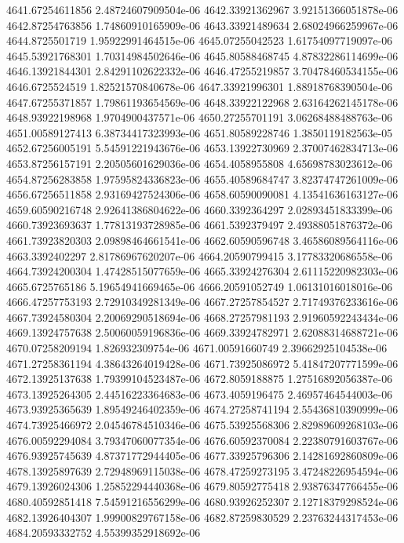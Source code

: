 {4641.67254611856 2.48724607909504e-06
4642.33921362967 3.92151366051878e-06
4642.87254763856 1.74860910165909e-06
4643.33921489634 2.68024966259967e-06
4644.8725501719 1.95922991464515e-06
4645.07255042523 1.61754097719097e-06
4645.53921768301 1.70314984502646e-06
4645.80588468745 4.87832286114699e-06
4646.13921844301 2.84291102622332e-06
4646.47255219857 3.70478460534155e-06
4646.6725524519 1.82521570840678e-06
4647.33921996301 1.88918768390504e-06
4647.67255371857 1.79861193654569e-06
4648.33922122968 2.63164262145178e-06
4648.93922198968 1.9704900437571e-06
4650.27255701191 3.06268488488763e-06
4651.00589127413 6.38734417323993e-06
4651.80589228746 1.3850119182563e-05
4652.67256005191 5.54591221943676e-06
4653.13922730969 2.37007462834713e-06
4653.87256157191 2.20505601629036e-06
4654.4058955808 4.65698783023612e-06
4654.87256283858 1.97595824336823e-06
4655.40589684747 3.82374747261009e-06
4656.67256511858 2.93169427524306e-06
4658.60590090081 4.13541636163127e-06
4659.60590216748 2.92641386804622e-06
4660.3392364297 2.02893451833399e-06
4660.73923693637 1.77813193728985e-06
4661.5392379497 2.49388051876372e-06
4661.73923820303 2.09898464661541e-06
4662.60590596748 3.46586089564116e-06
4663.3392402297 2.81786967620207e-06
4664.20590799415 3.17783320686558e-06
4664.73924200304 1.47428515077659e-06
4665.33924276304 2.61115220982303e-06
4665.6725765186 5.19654941669465e-06
4666.20591052749 1.06131016018016e-06
4666.47257753193 2.72910349281349e-06
4667.27257854527 2.71749376233616e-06
4667.73924580304 2.20069290518694e-06
4668.27257981193 2.91960592243434e-06
4669.13924757638 2.50060059196836e-06
4669.33924782971 2.62088314688721e-06
4670.07258209194 1.826932309754e-06
4671.00591660749 2.39662925104538e-06
4671.27258361194 4.38643264019428e-06
4671.73925086972 5.41847207771599e-06
4672.13925137638 1.79399104523487e-06
4672.8059188875 1.27516892056387e-06
4673.13925264305 2.44516223364683e-06
4673.4059196475 2.46957464544003e-06
4673.93925365639 1.89549246402359e-06
4674.27258741194 2.55436810390999e-06
4674.73925466972 2.04546784510346e-06
4675.53925568306 2.82989609268103e-06
4676.00592294084 3.79347060077354e-06
4676.60592370084 2.22380791603767e-06
4676.93925745639 4.87371772944405e-06
4677.33925796306 2.14281692860809e-06
4678.13925897639 2.72948969115038e-06
4678.47259273195 3.47248226954594e-06
4679.13926024306 1.25852294440368e-06
4679.80592775418 2.93876347766455e-06
4680.40592851418 7.54591216556299e-06
4680.93926252307 2.12718379298524e-06
4682.13926404307 1.99900829767158e-06
4682.87259830529 2.23763244317453e-06
4684.20593332752 4.55399352918692e-06
}
